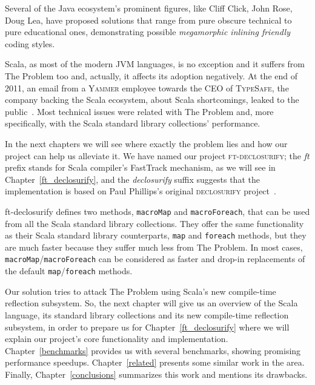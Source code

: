 Several of the Java ecosystem's prominent figures, like Cliff Click, John Rose,
Doug Lea, have proposed solutions that range from pure obscure technical to pure
educational ones, demonstrating possible \emph{megamorphic inlining friendly}
coding styles.

Scala, as most of the modern JVM languages, is no exception and it suffers from
The Problem too and, actually, it affects its adoption negatively. At the end of
2011, an email from a \textsc{Yammer} employee towards the CEO of \textsc{TypeSafe}, the company
backing the Scala ecosystem, about Scala shortcomings, leaked to the public~\cite{infoq:Yammer}. Most technical issues were
related with The Problem and, more specifically, with the Scala standard
library collections' performance. 

In the next chapters we will see where exactly the problem lies and how
our project can help us alleviate it. We have named our project
\textsc{ft-declosurify}; the \emph{ft} prefix stands for Scala compiler's FastTrack
mechanism, as we will see in Chapter~\ref{ft_declosurify}, and the \emph{declosurify} suffix suggests that
the implementation is based on Paul Phillips's original \textsc{declosurify} project~\cite{paulp:declosurify}. 

ft-declosurify defines two methods, \texttt{macroMap} and \texttt{macroForeach}, that can be used
from all the Scala standard library collections. They offer the same
functionality as their Scala standard library counterparts, \texttt{map} and \texttt{foreach}
methods, but they are much faster because they suffer much less from The
Problem. In most cases, \texttt{macroMap}/\texttt{macroForeach} can be considered as faster and
drop-in replacements of the default \texttt{map}/\texttt{foreach} methods.

Our solution tries to attack The Problem using Scala's new compile-time
reflection subsystem. So, the next chapter will give us an overview of the Scala language, its standard library collections and its new
compile-time reflection subsystem, in order to prepare us for Chapter~\ref{ft_declosurify}
where we will explain our project's core functionality and implementation.
Chapter~\ref{benchmarks} provides us with several benchmarks, showing promising performance
speedups. Chapter~\ref{related} presents some similar work in the area. Finally, Chapter~\ref{conclusions}
summarizes this work and mentions its drawbacks.